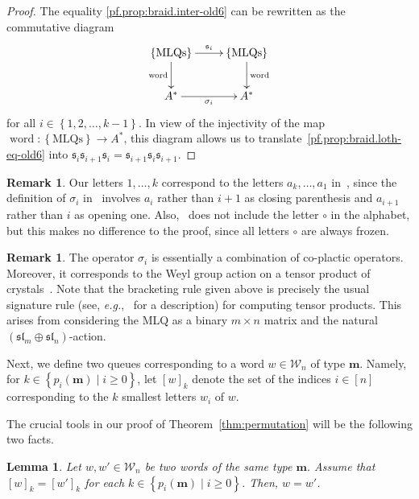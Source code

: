 \documentclass[reqno]{amsart}
\newcommand{\0}{\phantom{c}}
\newcommand{\mm}{\mathbf{m}}
\newcommand{\mcW}{\mathcal{W}}
\newcommand{\fraks}{\mathfrak{s}}
\newenvironment{verlong}{}{}
\newcommand{\word}{\operatorname{word}}
\newcommand{\set}[1]{\left\{ #1 \right\}}
\newcommand{\ive}[1]{\left[ #1 \right]}
\theoremstyle{plain}
\newtheorem{lemma}[thm]{Lemma}
\theoremstyle{definition}
\newtheorem{remark}[thm]{Remark}
\numberwithin{equation}{section}
\begin{document}
\begin{verlong}
\begin{proof}
The equality \eqref{pf.prop:braid.inter-old6} can be rewritten as the
commutative diagram
\[
\xymatrix{
 \set{\text{MLQs}} \ar[r]^{\fraks_i} \ar[d]_{\word} & \set{\text{MLQs}} \ar[d]^{\word} \\
 A^* \ar[r]_{\sigma_i} & A^*
}
\]
for all $i \in \set{1, 2, \dotsc, k-1}$.
In view of the injectivity of the map $\word \colon \set{\text{MLQs}} \to A^*$,
this diagram allows us to translate~\eqref{pf.prop:braid.loth-eq-old6} into
$\fraks_i \fraks_{i+1} \fraks_i = \fraks_{i+1} \fraks_i \fraks_{i+1}$.
\end{proof}

\begin{remark}
Our letters $1, \ldots, k$ correspond to the letters
$a_k, \ldots, a_1$ in~\cite{Loth},
since the definition of $\sigma_i$ in~\cite{Loth} involves $a_i$ rather
than $i+1$ as closing parenthesis and $a_{i+1}$ rather than $i$ as opening one.
Also,~\cite{Loth} does not include the letter $\circ$ in the alphabet,
but this makes no difference to the proof, since all letters $\circ$ are always frozen.
\end{remark}

\begin{remark}
The operator $\sigma_i$ is essentially a combination of co-plactic operators.
Moreover, it corresponds to the Weyl group action on a tensor product of crystals~\cite{BS17}.
Note that the bracketing rule given above is precisely the usual signature rule (see, \textit{e.g.},~\cite[Sec.~2.4]{BS17} for a description) for computing tensor products.
This arises from considering the MLQ as a binary $m \times n$ matrix and the natural $(\mathfrak{sl}_m \oplus \mathfrak{sl}_n)$-action.
\end{remark}

Next, we define two queues corresponding to a word $w \in \mcW_n$ of type $\mm$.
Namely, for $k \in \set{p_i(\mm) \mid i \geq 0}$, let $[w]_k$ denote the set of the indices $i \in \ive{n}$
corresponding to the $k$ smallest letters $w_i$ of $w$.

The crucial tools in our proof of Theorem~\ref{thm:permutation} will be the following two facts.

\begin{lemma} \label{lem:SL.reconstruct-old6}
Let $w, w' \in \mcW_n$ be two words of the same type $\mm$.
Assume that $[w]_k = [w']_k$ for each $k \in \set{p_i(\mm) \mid i \geq 0}$.
Then, $w = w'$.
\end{lemma}


\end{verlong}
\end{document}
